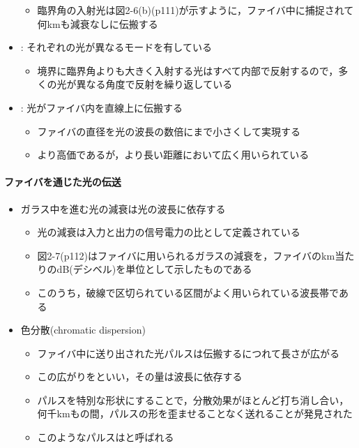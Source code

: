 \documentclass[a4paper]{ltjsarticle}
\begin{document}
\begin{itemize}
\begin{itemize}
					\item 臨界角の入射光は図2-6(b)(p111)が示すように，ファイバ中に捕捉されて何kmも減衰なしに伝搬する
				\end{itemize}
				\item {} : それぞれの光が異なるモードを有している
				\begin{itemize}
					\item 境界に臨界角よりも大きく入射する光はすべて内部で反射するので，多くの光が異なる角度で反射を繰り返している
				\end{itemize}
				\item {} : 光がファイバ内を直線上に伝搬する
				\begin{itemize}
					\item ファイバの直径を光の波長の数倍にまで小さくして実現する
					\item より高価であるが，より長い距離において広く用いられている
				\end{itemize}
			\end{itemize}
			\paragraph{ファイバを通じた光の伝送}
				\begin{itemize}
					\item ガラス中を進む光の減衰は光の波長に依存する
					\begin{itemize}
						\item 光の減衰は入力と出力の信号電力の比として定義されている
						\item 図2-7(p112)はファイバに用いられるガラスの減衰を，ファイバの\si{km}当たりの\si{dB}(デシベル)を単位として示したものである
						\item このうち，破線で区切られている区間がよく用いられている波長帯である
					\end{itemize}
					\item 色分散(chromatic dispersion)
					\begin{itemize}
						\item ファイバ中に送り出された光パルスは伝搬するにつれて長さが広がる
						\item この広がりをといい，その量は波長に依存する
						\item パルスを特別な形状にすることで，分散効果がほとんど打ち消し合い，何千kmもの間，パルスの形を歪ませることなく送れることが発見された
						\item このようなパルスはと呼ばれる
					\end{itemize}
				\end{itemize}
\end{document}
